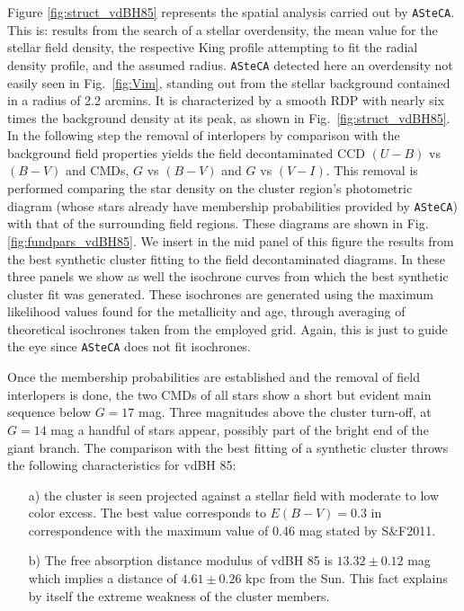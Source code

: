\documentclass[draft]{aa}
\begin{document}
Figure \ref{fig:struct_vdBH85} represents the spatial analysis carried
out by \texttt{ASteCA}. This is: results from the search of a stellar
overdensity, the mean value for the stellar field density, the respective King
profile attempting to fit the radial density profile, and the assumed radius.
%
\texttt{ASteCA} detected here an overdensity not easily seen in
Fig.~\ref{fig:Vim}, standing out from the stellar background contained
in a radius of 2.2 arcmins. It is characterized by a smooth RDP 
with nearly six times the background density at its peak, 
as shown in Fig.~\ref{fig:struct_vdBH85}.\\

In the following step the removal of interlopers by comparison with the
background field properties yields the field decontaminated CCD
$(U-B)$ vs $(B-V)$ and CMDs, $G$ vs $(B-V)$ and $G$ vs $(V-I)$.
This removal is performed comparing the star density on the cluster
region's photometric diagram (whose stars already have membership
probabilities provided by \texttt{ASteCA}) with that of the surrounding field
regions. These diagrams are shown in Fig. \ref{fig:fundpars_vdBH85}.
%
We insert in the mid panel of this figure the results from the
best synthetic cluster fitting to the field decontaminated diagrams. In these
three panels we show as well the isochrone curves from which the best
synthetic cluster fit was generated. These isochrones are generated
using the maximum likelihood values found for the metallicity and age, through
averaging of theoretical isochrones taken from the employed grid.
Again, this is just to guide the eye since \texttt{ASteCA} does not fit
isochrones.

Once the membership probabilities are established and the removal of field
interlopers is done, the two CMDs of all stars show a short but evident main
sequence below $G=17$ mag.
Three magnitudes above the cluster turn-off, at $G=14$ mag a handful of stars
appear, possibly part of the bright end of the giant branch. The comparison
with the best fitting of a synthetic cluster throws the following
characteristics for vdBH 85:

\begin{itemize}
\item [a)] the cluster is seen projected against a stellar field with moderate
    to low color excess. The best value corresponds to $E(B-V)=0.3$ in
    correspondence with the maximum value of 0.46 mag stated by S\&F2011.
\item [b)] The free absorption distance modulus of vdBH 85 is
    $13.32\pm0.12$ mag which implies a distance of $4.61\pm0.26$ kpc
    from the Sun. This fact explains by itself the extreme weakness of the
    cluster members.
\end{itemize}
\end{document}
